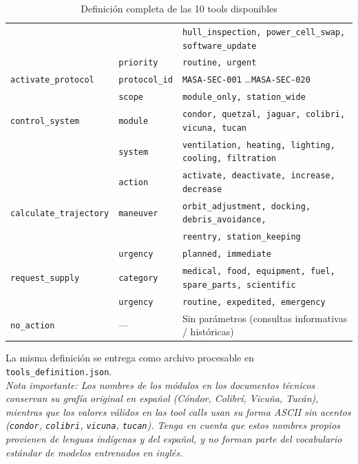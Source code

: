 \documentclass{article}
\begin{document}
\begin{table}[H]
\begin{tabular}{|l|l|l|}
    &                          & \texttt{hull\_inspection, power\_cell\_swap, software\_update} \\
    & \texttt{priority}        & \texttt{routine, urgent} \\ \hline
{\texttt{activate\_protocol}}
    & \texttt{protocol\_id}    & \texttt{MASA-SEC-001} \ldots \texttt{MASA-SEC-020} \\
    & \texttt{scope}           & \texttt{module\_only, station\_wide} \\ \hline
{\texttt{control\_system}}
    & \texttt{module}          & \texttt{condor, quetzal, jaguar, colibri, vicuna, tucan} \\
    & \texttt{system}          & \texttt{ventilation, heating, lighting, cooling, filtration} \\
    & \texttt{action}          & \texttt{activate, deactivate, increase, decrease} \\ \hline
{\texttt{calculate\_trajectory}}
    & \texttt{maneuver}        & \texttt{orbit\_adjustment, docking, debris\_avoidance,} \\
    &                          & \texttt{reentry, station\_keeping} \\
    & \texttt{urgency}         & \texttt{planned, immediate} \\ \hline
{\texttt{request\_supply}}
    & \texttt{category}        & \texttt{medical, food, equipment, fuel, spare\_parts, scientific} \\
    & \texttt{urgency}         & \texttt{routine, expedited, emergency} \\ \hline
\texttt{no\_action} & --- & Sin parámetros (consultas informativas / históricas) \\ \hline
\end{tabular}
\caption{Definición completa de las 10 tools disponibles}
\end{table}

La misma definición se entrega como archivo procesable en \texttt{tools\_definition.json}.\\

\textit{Nota importante: Los nombres de los módulos en los documentos técnicos conservan su grafía original en español (Cóndor, Colibrí, Vicuña, Tucán), mientras que los valores válidos en las \textit{tool calls} usan su forma ASCII sin acentos (\texttt{condor}, \texttt{colibri}, \texttt{vicuna}, \texttt{tucan}). Tenga en cuenta que estos nombres propios provienen de lenguas indígenas y del español, y no forman parte del vocabulario estándar de modelos entrenados en inglés.}
\end{document}
